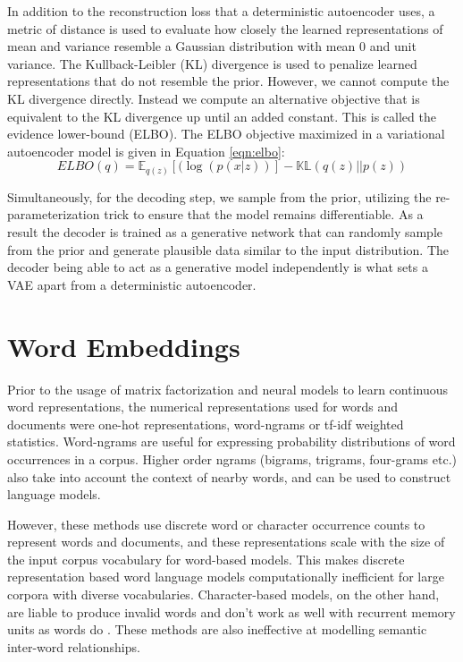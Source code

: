 In addition to the reconstruction loss that a deterministic autoencoder uses, a metric of distance is used to evaluate how closely the learned representations of mean and variance resemble a Gaussian distribution with mean 0 and unit variance. The Kullback-Leibler (KL) divergence \citep{kullback1951information} is used to penalize learned representations that do not resemble the prior. However, we cannot compute the KL divergence directly. Instead we compute an alternative objective that is equivalent to the KL divergence up until an added constant. This is called the evidence lower-bound (ELBO). The ELBO objective maximized in a variational autoencoder model is given in Equation \ref{eqn:elbo}:
\begin{equation} \label{eqn:elbo}
	ELBO(q) = \mathbb{E}_{q(z)} [(\log(p(x|z))] - \mathbb{KL}(q(z)||p(z))
\end{equation}

Simultaneously, for the decoding step, we sample from the prior, utilizing the re-parameterization trick to ensure that the model remains differentiable. As a result the decoder is trained as a generative network that can randomly sample from the prior and generate plausible data similar to the input distribution. The decoder being able to act as a generative model independently is what sets a VAE apart from a deterministic autoencoder.


\section{Word Embeddings}

Prior to the usage of matrix factorization and neural models to learn continuous word representations, the numerical representations used for words and documents were one-hot representations, word-ngrams \citep{brown1992class} or tf-idf weighted statistics. Word-ngrams are useful for expressing probability distributions of word occurrences in a corpus. Higher order ngrams (bigrams, trigrams, four-grams etc.) also take into account the context of nearby words, and can be used to construct language models.

However, these methods use discrete word or character occurrence counts to represent words and documents, and these representations scale with the size of the input corpus vocabulary for word-based models. This makes discrete representation based word language models computationally inefficient for large corpora with diverse vocabularies. Character-based models, on the other hand, are liable to produce invalid words and don't work as well with recurrent memory units as words do \citep{bojanowski2015alternative}. These methods are also ineffective at modelling semantic inter-word relationships.

